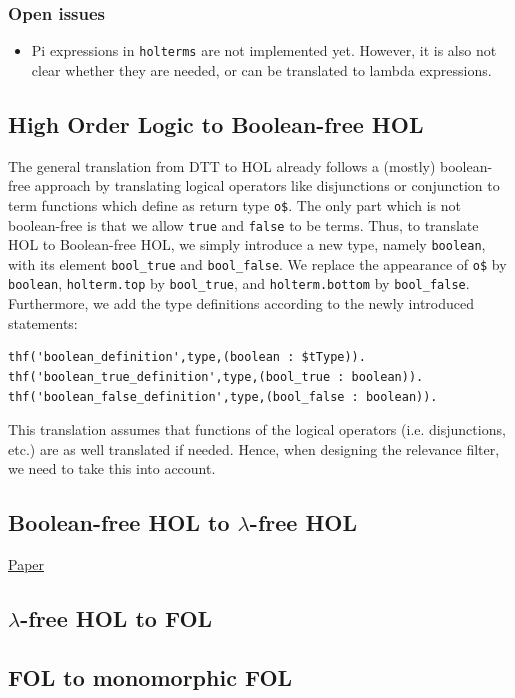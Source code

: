 \documentclass[a4paper]{article}
\begin{document}
\subsubsection{Open issues}
\begin{itemize}
	\item Pi expressions in \texttt{holterms} are not implemented yet. However, it is also not clear whether they are needed, or can be translated to lambda expressions.
\end{itemize}
\subsection{High Order Logic to Boolean-free HOL}
\label{sec:hol_to_boolean_free}
The general translation from DTT to HOL already follows a (mostly) boolean-free approach by translating logical operators like disjunctions or conjunction to term functions which define as return type \texttt{o\$}. The only part which is not boolean-free is that we allow \texttt{true} and \texttt{false} to be terms. Thus, to translate HOL to Boolean-free HOL, we simply introduce a new type, namely \texttt{boolean}, with its element \texttt{bool\_true} and \texttt{bool\_false}. We replace the appearance of \texttt{o\$} by \texttt{boolean}, \texttt{holterm.top} by \texttt{bool\_true}, and \texttt{holterm.bottom} by \texttt{bool\_false}. Furthermore, we add the type definitions according to the newly introduced statements:
\begin{verbatim}
thf('boolean_definition',type,(boolean : $tType)).
thf('boolean_true_definition',type,(bool_true : boolean)).
thf('boolean_false_definition',type,(bool_false : boolean)).
\end{verbatim}
This translation assumes that functions of the logical operators (i.e. disjunctions, etc.) are as well translated if needed. Hence, when designing the relevance filter, we need to take this into account.
\subsection{Boolean-free HOL to $\lambda$-free HOL}
\href{http://matryoshka.gforge.inria.fr/pubs/lfhosup_paper.pdf}{Paper} \cite{LambdaFreeHOL}
\subsection{$\lambda$-free HOL to FOL}
\subsection{FOL to monomorphic FOL}
\end{document}
